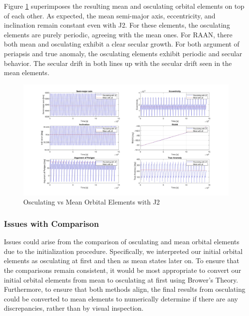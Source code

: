 Figure \ref{fig:osc_mean_oe} superimposes the resulting mean and osculating orbital elements on top of each other. As expected, the mean semi-major axis, eccentricity, and inclination remain constant even with J2. For these elements, the osculating elements are purely periodic, agreeing with the mean ones. For RAAN, there both mean and osculating exhibit a clear secular growth. For both argument of periapsis and true anomaly, the osculating elements exhibit periodic and secular behavior. The secular drift in both lines up with the secular drift seen in the mean elements.

\begin{figure}[H]
    \centering
    \includegraphics[width=1.1\linewidth]{PS1/Figures/OE_mean_osc_J2_comparison.jpg}
    \caption{Osculating vs Mean Orbital Elements with J2}
    \label{fig:osc_mean_oe}
\end{figure}

\subsubsection{Issues with Comparison}\label{sec:comp_issues}
Issues could arise from the comparison of osculating and mean orbital elements due to the initialization procedure. Specifically, we interpreted our initial orbital elements as osculating at first and then as mean states later on. To ensure that the comparisons remain consistent, it would be most appropriate to convert our initial orbital elements from mean to osculating at first using Brower's Theory. Furthermore, to ensure that both methods align, the final results from osculating could be converted to mean elements to numerically determine if there are any discrepancies, rather than by visual inspection.
